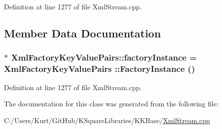 Definition at line 1277 of file Xml\+Stream.\+cpp.



\subsection{Member Data Documentation}
\subsubsection[{\texorpdfstring{factory\+Instance}{factoryInstance}}]{ $\ast$ Xml\+Factory\+Key\+Value\+Pairs\+::factory\+Instance = {\bf Xml\+Factory\+Key\+Value\+Pairs} \+::{\bf Factory\+Instance} ()\hspace{0.3cm}{\ttfamily [static]}}\hypertarget{class_xml_factory_key_value_pairs_a7cfa7997b8c6e25dfaaabc6d5b491cf6}{}\label{class_xml_factory_key_value_pairs_a7cfa7997b8c6e25dfaaabc6d5b491cf6}


Definition at line 1277 of file Xml\+Stream.\+cpp.



The documentation for this class was generated from the following file\+:\begin{DoxyCompactItemize}
\item 
C\+:/\+Users/\+Kurt/\+Git\+Hub/\+K\+Square\+Libraries/\+K\+K\+Base/\hyperlink{_xml_stream_8cpp}{Xml\+Stream.\+cpp}\end{DoxyCompactItemize}
